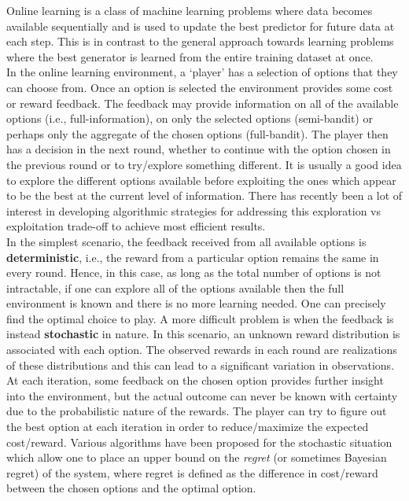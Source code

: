 Online learning is a class of machine learning problems where data becomes available sequentially and is used to update the best predictor for future data at each step. This is in contrast to the general approach towards learning problems where the best generator is learned from the entire training dataset at once.\\
In the online learning environment, a `player' has a selection of options that they can choose from. Once an option is selected the environment provides some cost or reward feedback. The feedback may provide information on all of the available options (i.e., full-information), on only the selected options (semi-bandit) or perhaps only the aggregate of the chosen options (full-bandit). The player then has a decision in the next round, whether to continue with the option chosen in the previous round or to try/explore something different. It is usually a good idea to explore the different options available before exploiting the ones which appear to be the best at the current level of information. There has recently been a lot of interest in developing algorithmic strategies for addressing this exploration vs exploitation trade-off to achieve most efficient results.\\

In the simplest scenario, the feedback received from all available options is \textbf{deterministic}, i.e., the reward from a particular option remains the same in every round. Hence, in this case, as long as the total number of options is not intractable, if one can explore all of the options available then the full environment is known and there is no more learning needed. One can precisely find the optimal choice to play. A more difficult problem is when the feedback is instead \textbf{stochastic} in nature. In this scenario, an unknown reward distribution is associated with each option. The observed rewards in each round are realizations of these distributions and this can lead to a significant variation in observations. At each iteration, some feedback on the chosen option provides further insight into the environment, but the actual outcome can never be known with certainty due to the probabilistic nature of the rewards. The player can try to figure out the best option at each iteration in order to reduce/maximize the expected cost/reward. Various algorithms have been proposed for the stochastic situation which allow one to place an upper bound on the \emph{regret} (or sometimes Bayesian regret) of the system, where regret is defined as the difference in cost/reward between the chosen options and the optimal option.\\

